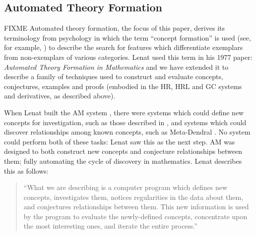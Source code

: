\subsection{Automated Theory Formation}

FIXME Automated theory formation, the focus of this paper, derives its
terminology from psychology in which the term ``concept formation'' is
used (see, for example, \cite{bruner:67}) to describe the search for
features which differentiate exemplars from non-exemplars of various
categories. Lenat used this term in his 1977 paper: {\em Automated
  Theory Formation in Mathematics} \cite{lenat:77} and we have
extended it to describe a family of techniques used to construct and
evaluate concepts, conjectures, examples and proofs (embodied in the
HR, HRL and GC systems and derivatives, as described above).

When Lenat built the AM system \cite{lenat:77}, there were systems
which could define new concepts for investigation, such as those
described in \cite{winston}, and systems which could discover
relationships among known concepts, such as Meta-Dendral
\cite{buchanan:75}. No system could perform both of these tasks: Lenat
saw this as the next step. AM was designed to both construct new
concepts and conjecture relationships between them; fully automating
the cycle of discovery in mathematics. Lenat describes this as
follows:

\begin{quote}
``What we are describing is a computer program which
defines new concepts, investigates them, notices
regularities in the data about them, and conjectures
relationships between them. This new information is used
by the program to evaluate the newly-defined concepts,
concentrate upon the most interesting ones, and iterate the
entire process.'' \cite[p. 834]{lenat:77}
\end{quote}

